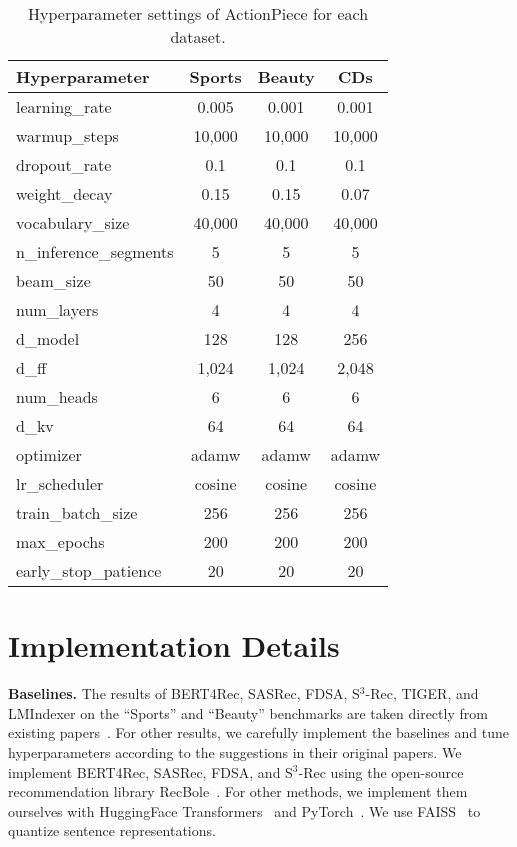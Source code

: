 \begin{table}[!t]
\centering
\small
\caption{Hyperparameter settings of ActionPiece for each dataset.}
\label{tab:reproduction}
\vskip 0.1in
\begin{tabular}{l@{\hspace{0.5in}}c@{\hspace{0.5in}}c@{\hspace{0.5in}}c}
\toprule
\textbf{Hyperparameter} & \textbf{Sports} & \textbf{Beauty} & \textbf{CDs} \\
\midrule
learning\_rate & 0.005 & 0.001 & 0.001 \\
warmup\_steps & 10,000 & 10,000 & 10,000 \\
dropout\_rate & 0.1 & 0.1 & 0.1 \\
weight\_decay & 0.15 & 0.15 & 0.07 \\
vocabulary\_size & 40,000 & 40,000 & 40,000 \\
n\_inference\_segments & 5 & 5 & 5 \\
beam\_size & 50 & 50 & 50 \\
num\_layers & 4 & 4 & 4 \\
d\_model & 128 & 128 & 256 \\
d\_ff & 1,024 & 1,024 & 2,048 \\
num\_heads & 6 & 6 & 6 \\
d\_kv & 64 & 64 & 64 \\
optimizer & adamw & adamw & adamw \\
lr\_scheduler & cosine & cosine & cosine \\
train\_batch\_size & 256 & 256 & 256 \\
max\_epochs & 200 & 200 & 200 \\
early\_stop\_patience & 20 & 20 & 20 \\
\bottomrule
\end{tabular}
\end{table}

\section{Implementation Details}\label{appendix:implementation}

\textbf{Baselines.} The results of BERT4Rec, SASRec, FDSA, S$^3$-Rec, TIGER, and LMIndexer on the ``Sports'' and ``Beauty'' benchmarks are taken directly from existing papers~\cite{zhou2020s3,rajput2023tiger,jin2024lmindexer}. For other results, we carefully implement the baselines and tune hyperparameters according to the suggestions in their original papers. We implement BERT4Rec, SASRec, FDSA, and S$^3$-Rec using the open-source recommendation 
library RecBole~\cite{zhao2021recbole}. For other methods, we implement them ourselves with HuggingFace Transformers~\cite{wolf2020transformers} and PyTorch~\cite{paszke2019pytorch}. We use FAISS~\cite{douze2024faiss} to quantize sentence representations.

